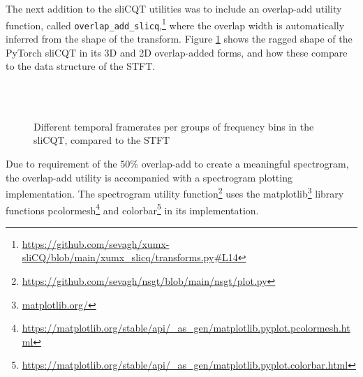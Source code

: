 \documentclass[report.tex]{subfiles}
\begin{document}
The next addition to the sliCQT utilities was to include an overlap-add utility function, called \Verb#overlap_add_slicq#,\footnote{\url{https://github.com/sevagh/xumx-sliCQ/blob/main/xumx_slicq/transforms.py\#L14}} where the overlap width is automatically inferred from the shape of the transform. Figure \ref{fig:slicqt3d} shows the ragged shape of the PyTorch sliCQT in its 3D and 2D overlap-added forms, and how these compare to the data structure of the STFT.

\begin{figure}[ht]
	\centering
	\\
	\\
	\caption{Different temporal framerates per groups of frequency bins in the sliCQT, compared to the STFT}
	\label{fig:slicqt3d}
\end{figure}

Due to requirement of the 50\% overlap-add to create a meaningful spectrogram, the overlap-add utility is accompanied with a spectrogram plotting implementation.  The spectrogram utility function\footnote{\url{https://github.com/sevagh/nsgt/blob/main/nsgt/plot.py}} uses the matplotlib\footnote{\url{matplotlib.org/}} library functions pcolormesh\footnote{\url{https://matplotlib.org/stable/api/_as_gen/matplotlib.pyplot.pcolormesh.html}} and colorbar\footnote{\url{https://matplotlib.org/stable/api/_as_gen/matplotlib.pyplot.colorbar.html}} in its implementation.
\end{document}
